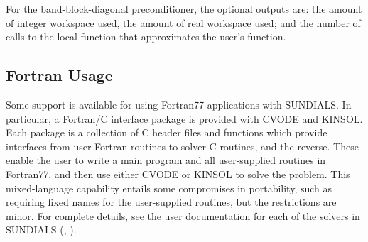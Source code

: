For the band-block-diagonal preconditioner, the optional outputs are:
the amount of integer workspace used, the amount of real workspace
used; and the number of calls to the local function that approximates
the user's function.

\subsection{Fortran Usage} 
\label{ss:Fortran_usage}

Some support is available for using Fortran77 applications with
SUNDIALS.  In particular, a Fortran/C interface package is provided
with CVODE and KINSOL.  Each package is a collection of C header files
and functions which provide interfaces from user Fortran routines to
solver C routines, and the reverse.  These enable the user to write a
main program and all user-supplied routines in Fortran77, and then use
either CVODE or KINSOL to solve the problem.  This mixed-language
capability entails some compromises in portability, such as requiring
fixed names for the user-supplied routines, but the restrictions are
minor.  For complete details, see the user documentation for each of
the solvers in SUNDIALS (\cite{HiSe:03a}, \cite{HiSe:03c}).
